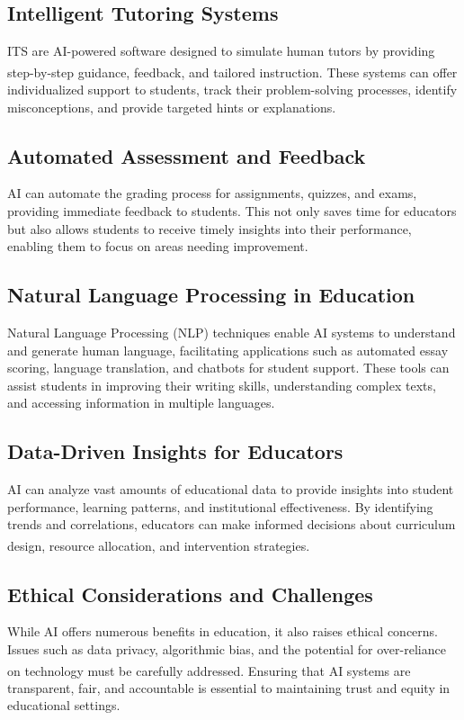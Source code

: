 \documentclass[manuscript,screen,review]{acmart}
\begin{document}
\subsection{Intelligent Tutoring Systems}
ITS are AI-powered software designed to simulate human tutors by providing step-by-step guidance, feedback, and tailored instruction\textsuperscript{\cite{kulik2016effectiveness}}. These systems can offer individualized support to students, track their problem-solving processes, identify misconceptions, and provide targeted hints or explanations.

\subsection{Automated Assessment and Feedback}
AI can automate the grading process for assignments, quizzes, and exams, providing immediate feedback to students. This not only saves time for educators but also allows students to receive timely insights into their performance, enabling them to focus on areas needing improvement.

\subsection{Natural Language Processing in Education}
Natural Language Processing (NLP) techniques enable AI systems to understand and generate human language, facilitating applications such as automated essay scoring, language translation, and chatbots for student support. These tools can assist students in improving their writing skills, understanding complex texts, and accessing information in multiple languages.

\subsection{Data-Driven Insights for Educators}
AI can analyze vast amounts of educational data to provide insights into student performance, learning patterns, and institutional effectiveness. By identifying trends and correlations, educators can make informed decisions about curriculum design, resource allocation, and intervention strategies\textsuperscript{\cite{siemens2013learning}}.

\subsection{Ethical Considerations and Challenges}
While AI offers numerous benefits in education, it also raises ethical concerns. Issues such as data privacy, algorithmic bias, and the potential for over-reliance on technology must be carefully addressed\textsuperscript{\cite{binns2018fairness}}. Ensuring that AI systems are transparent, fair, and accountable is essential to maintaining trust and equity in educational settings.
\end{document}
